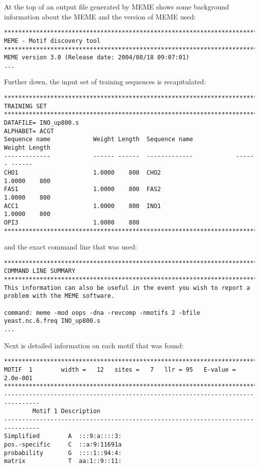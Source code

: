 At the top of an output file generated by MEME shows some background information
about the MEME and the version of MEME used:
\begin{verbatim}
********************************************************************************
MEME - Motif discovery tool
********************************************************************************
MEME version 3.0 (Release date: 2004/08/18 09:07:01)
...
\end{verbatim}
Further down, the input set of training sequences is recapitulated:
\begin{verbatim}
********************************************************************************
TRAINING SET
********************************************************************************
DATAFILE= INO_up800.s
ALPHABET= ACGT
Sequence name            Weight Length  Sequence name            Weight Length
-------------            ------ ------  -------------            ------ ------
CHO1                     1.0000    800  CHO2                     1.0000    800
FAS1                     1.0000    800  FAS2                     1.0000    800
ACC1                     1.0000    800  INO1                     1.0000    800
OPI3                     1.0000    800
********************************************************************************
\end{verbatim}
and the exact command line that was used:
\begin{verbatim}
********************************************************************************
COMMAND LINE SUMMARY
********************************************************************************
This information can also be useful in the event you wish to report a
problem with the MEME software.

command: meme -mod oops -dna -revcomp -nmotifs 2 -bfile yeast.nc.6.freq INO_up800.s
...
\end{verbatim}
Next is detailed information on each motif that was found:
\begin{verbatim}
********************************************************************************
MOTIF  1        width =   12   sites =   7   llr = 95   E-value = 2.0e-001
********************************************************************************
--------------------------------------------------------------------------------
        Motif 1 Description
--------------------------------------------------------------------------------
Simplified        A  :::9:a::::3:
pos.-specific     C  ::a:9:11691a
probability       G  ::::1::94:4:
matrix            T  aa:1::9::11:
\end{verbatim}
